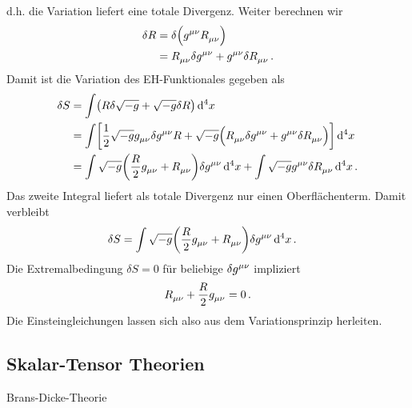 d.h. die Variation liefert eine totale Divergenz.
Weiter berechnen wir
\begin{equation}
\begin{split}
\delta R &=\delta \left(\tensor{g}{^\mu^\nu}\tensor{R}{_\mu_\nu}\right)\\
&=\tensor{R}{_\mu_\nu}\delta\tensor{g}{^\mu^\nu}
+\tensor{g}{^\mu^\nu}\delta\tensor{R}{_\mu_\nu}\,.
\end{split}
\end{equation}
Damit ist die Variation des EH-Funktionales gegeben als
\begin{equation}
\begin{split}
\delta S
&=\int\left(
R\delta\sqrt{-g}+\sqrt{-g}\delta R\right)\dif{}^4x\\
&=\int \left[
\frac{1}{2}\sqrt{-g}\tensor{g}{_\mu_\nu}\delta\tensor{g}{^\mu^\nu}
R+\sqrt{-g}\left(\tensor{R}{_\mu_\nu}\delta\tensor{g}{^\mu^\nu}
+\tensor{g}{^\mu^\nu}\delta\tensor{R}{_\mu_\nu}\right)\right]\dif{}^4x\\
&=\int \sqrt{-g}\left(
\frac{R}{2}\tensor{g}{_\mu_\nu}
+\tensor{R}{_\mu_\nu}\right)\delta\tensor{g}{^\mu^\nu}\dif{}^4x
+\int \sqrt{-g}\tensor{g}{^\mu^\nu}\delta\tensor{R}{_\mu_\nu}\dif{}^4x
\,.
\end{split}
\end{equation}
Das zweite Integral liefert als totale Divergenz nur einen Oberflächenterm.
Damit verbleibt
\begin{equation}
\begin{split}
\delta S
&=\int \sqrt{-g}\left(
\frac{R}{2}\tensor{g}{_\mu_\nu}
+\tensor{R}{_\mu_\nu}\right)\delta\tensor{g}{^\mu^\nu}\dif{}^4x\,.
\end{split}
\end{equation}
Die Extremalbedingung $\delta S=0$ für beliebige $\delta\tensor{g}{^\mu^\nu}$
impliziert
\begin{equation}
\tensor{R}{_\mu_\nu}+\frac{R}{2}\tensor{g}{_\mu_\nu}=0\, .
\end{equation}
Die Einsteingleichungen lassen sich also aus dem Variationsprinzip herleiten.
\subsection{Skalar-Tensor Theorien}
Brans-Dicke-Theorie
